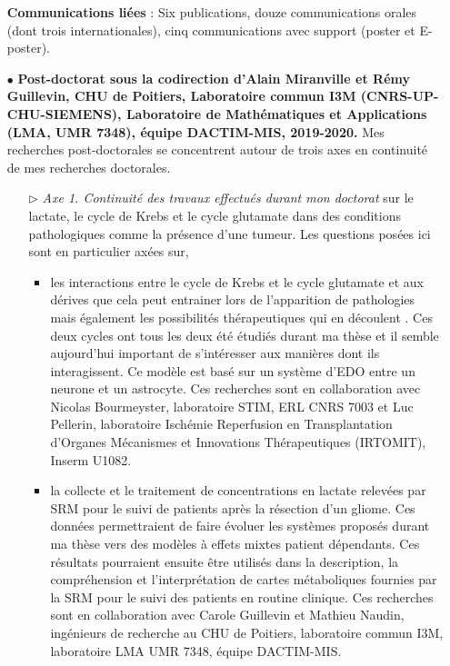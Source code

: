 \documentclass[a4paper, 12pt, twoside, openright]{article}
\begin{document}
\begin{itemize}
\textbf{Communications liées }: Six publications, douze communications orales (dont trois internationales), cinq communications avec support (poster et E-poster).

\newpage
\item[\color{MagSombre}$\bullet$] \textbf{\color{MagSombre}Post-doctorat sous la codirection d'Alain Miranville et Rémy Guillevin, CHU de Poitiers, Laboratoire commun I3M (CNRS-UP-CHU-SIEMENS), Laboratoire de Mathématiques et Applications (LMA, UMR 7348), équipe DACTIM-MIS, 2019-2020.} Mes recherches post-doctorales se concentrent autour de trois axes en continuité de mes recherches doctorales.
\begin{itemize}
\item[$\triangleright$]\textit{Axe 1. Continuité des travaux effectués durant mon doctorat} sur le lactate, le cycle de Krebs et le cycle glutamate dans des conditions pathologiques comme la présence d'une tumeur. Les questions posées ici sont en particulier axées sur, 
\begin{itemize}
\item les interactions entre le cycle de Krebs et le cycle glutamate et aux dérives que cela peut entrainer lors de l'apparition de pathologies mais également les possibilités thérapeutiques qui en découlent \cite{maus2017, stobart2013, kreft2012}. Ces deux cycles ont tous les deux été étudiés durant ma thèse et il semble aujourd'hui important de s'intéresser aux manières dont ils interagissent. Ce modèle est basé sur un système d'EDO entre un neurone et un astrocyte. Ces recherches sont en collaboration avec Nicolas Bourmeyster, laboratoire STIM, ERL CNRS 7003 et Luc Pellerin, laboratoire  Ischémie Reperfusion en Transplantation d’Organes Mécanismes et Innovations Thérapeutiques (IRTOMIT), Inserm U1082.
\item la collecte et le traitement de concentrations en lactate relevées par SRM pour le suivi de patients après la résection d'un gliome. Ces données permettraient de faire évoluer les systèmes proposés durant ma thèse vers des modèles à effets mixtes patient dépendants. Ces résultats pourraient ensuite être utilisés dans la description, la compréhension et l'interprétation de cartes métaboliques fournies par la SRM pour le suivi des patients en routine clinique. Ces recherches sont en collaboration avec Carole Guillevin et Mathieu Naudin, ingénieurs de recherche au CHU de Poitiers, laboratoire commun I3M, laboratoire LMA UMR 7348, équipe DACTIM-MIS.
\end{itemize}

\end{itemize}
\end{itemize}
\end{document}
